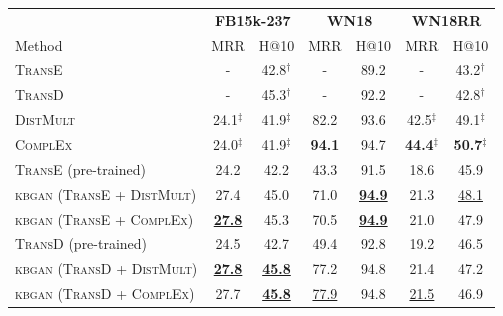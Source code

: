 \documentclass[11pt,a4paper]{article}
\begin{document}
\begin{table}[t]
\centering
\begin{tabular}{|l|cc|cc|cc|}
\hline
             & \multicolumn{2}{c}{\bf FB15k-237} \vline & \multicolumn{2}{c}{\bf WN18} \vline & \multicolumn{2}{c}{\bf WN18RR}\vline \\
Method                         & MRR         & H@10   & MRR         & H@10 & MRR & H@10\\
\hline
\textsc{TransE}    & - & 42.8$^{\dag}$ & - & 89.2 & -    & 43.2$^{\dag}$ \\
\textsc{TransD}    & - & 45.3$^{\dag}$ & - & 92.2 & -    & 42.8$^{\dag}$ \\ 
\textsc{DistMult}  & 24.1$^{\ddag}$  & 41.9$^{\ddag}$ & 82.2 & 93.6 & 42.5$^{\ddag}$ & 49.1$^{\ddag}$ \\
\textsc{ComplEx}   & 24.0$^{\ddag}$  & 41.9$^{\ddag}$ & \textbf{94.1} & 94.7 & \textbf{44.4}$^{\ddag}$ & \textbf{50.7}$^{\ddag}$ \\
\hline
\textsc{TransE} (pre-trained)                         & 24.2    & 42.2  & 43.3   & 91.5 & 18.6 & 45.9 \\
\textsc{kbgan} (\textsc{TransE} + \textsc{DistMult})  & 27.4  & 45.0 & 71.0 & \textbf{\underline{94.9}} & 21.3 & \underline{48.1} \\
\textsc{kbgan} (\textsc{TransE} + \textsc{ComplEx})   & \textbf{\underline{27.8}} & 45.3 & 70.5  & \textbf{\underline{94.9}} & 21.0 & 47.9 \\
\textsc{TransD} (pre-trained)                         & 24.5 & 42.7 & 49.4  & 92.8 & 19.2 & 46.5 \\
\textsc{kbgan} (\textsc{TransD} + \textsc{DistMult})  & \textbf{\underline{27.8}} & \textbf{\underline{45.8}} & 77.2 & 94.8 & 21.4 & 47.2\\
\textsc{kbgan} (\textsc{TransD} + \textsc{ComplEx})   & 27.7 & \textbf{\underline{45.8}} & \underline{77.9} & 94.8 & \underline{21.5} & 46.9\\ \hline

\end{tabular}
\end{table}
\end{document}
